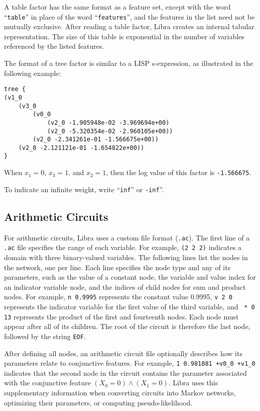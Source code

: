 \documentclass[11pt]{article}
\begin{document}
A table factor has the same format as a feature set, except with the word
``{\tt table}'' in place of the word ``{\tt features}'', and the features in
the list need not be mutually exclusive.  After reading a table factor, Libra
creates an internal tabular representation.  The size of this table is
exponential in the number of variables referenced by the listed features.

The format of a tree factor is similar to a LISP s-expression, as illustrated
in the following example:
\begin{verbatim}
tree {
(v1_0
    (v3_0
        (v0_0
            (v2_0 -1.905948e-02 -3.969694e+00)
            (v2_0 -5.320354e-02 -2.960105e+00))
        (v2_0 -2.341261e-01 -1.566675e+00))
    (v2_0 -2.121121e-01 -1.654822e+00))
}
\end{verbatim}
When $x_1 = 0$, $x_3 = 1$, and $x_2 = 1$, then the log value of this factor
is {\tt -1.566675}.

To indicate an infinite weight, write ``{\tt inf}'' or {\tt -inf}''.

\subsection{Arithmetic Circuits}

For arithmetic circuits, Libra uses a custom file format ({\tt .ac}).
The first line of a {\tt .ac} file specifies the range of each
variable. For example, {\tt (2 2 2)} indicates a domain with three
binary-valued variables.  The following lines list the nodes in the
network, one per line.  Each line specifies the node type and any of
its parameters, such as the value of a constant node, the variable and
value index for an indicator variable node, and the indices of child
nodes for sum and product nodes.  For example, {\tt n 0.9995}
represents the constant value 0.9995, {\tt v 2 0} represents the
indicator variable for the first value of the third variable, and {\tt
* 0 13} represents the product of the first and fourteenth nodes.
Each node must appear after all of its children. The root of the
circuit is therefore the last node, followed by the string {\tt EOF}.

After defining all nodes, an arithmetic circuit file optionally
describes how its parameters relate to conjunctive features.  For
example, \verb|1 0.981081 +v0_0 +v1_0| indicates that the second node
in the circuit contains the parameter associated with the conjunctive
feature $(X_0 = 0) \wedge (X_1 = 0)$.  Libra uses this supplementary
information when converting circuits into Markov networks, optimizing
their parameters, or computing pseudo-likelihood.
\end{document}
